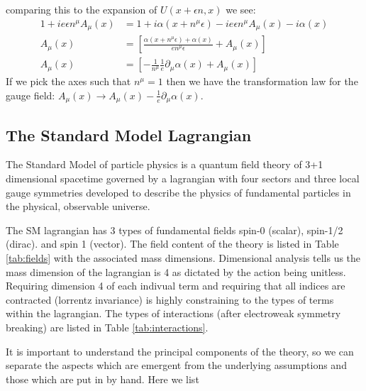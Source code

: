 comparing this to the expansion of $U(x+\epsilon n, x)$ we see:
\begin{align*}
1 + ie\epsilon n^\mu A_\mu (x) &= 1 + i \alpha (x+n^\mu\epsilon ) - ie \epsilon n^\mu A_\mu(x) - i\alpha(x)\\
A_\mu(x) &=  \left [ \frac{\alpha(x+n^\mu\epsilon) + \alpha(x)}{en^\mu \epsilon} + A_\mu(x) \right] \\
A_\mu(x) &=  \left [ -\frac{1}{n^\mu}\frac{1}{e}\partial_\mu \alpha(x) + A_\mu(x) \right]
\end{align*}
If we pick the axes such that $n^\mu = 1$ then we have the transformation law for the gauge field: $A_\mu(x) \rightarrow A_\mu(x) - \frac{1}{e} \partial_\mu \alpha(x)$.

\subsection{The Standard Model Lagrangian}

The Standard Model of particle physics is a quantum field theory of 3+1 dimensional 
spacetime governed by a lagrangian with four sectors and three local gauge symmetries
developed to describe the physics of fundamental particles in the physical, observable universe.  

The SM lagrangian has 3 types of fundamental fields spin-0 (scalar), spin-1/2 (dirac). and spin 1 (vector). The field
content of the theory is listed in Table \ref{tab:fields} with the associated mass dimensions. Dimensional analysis tells
us the mass dimension of the lagrangian is 4 as dictated by the action being unitless. Requiring dimension
4 of each indivual term and requiring that all indices are contracted (lorrentz invariance) is highly constraining 
to the types of terms within the lagrangian. The types of interactions (after electroweak symmetry breaking) are listed 
in Table \ref{tab:interactions}. 

It is important to understand the principal components of the theory, so we can separate the aspects which are emergent from
the underlying assumptions and those which are put in by hand. Here we list

